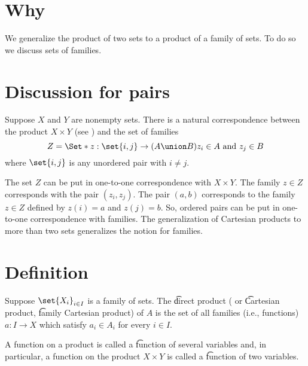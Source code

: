 
\section*{Why}

We generalize the product of two sets to a product of a family of sets.
To do so we discuss sets of families.

\section*{Discussion for pairs}

Suppose $X$ and $Y$ are nonempty sets.
There is a natural correspondence between the product $X \times Y$ (see ) and the set of families
\[
Z = \Set*{z: \set{i, j} \to (A \union B)}{z_i \in A \text{ and } z_j \in B}
\]
where $\set{i,j}$ is any unordered pair with $i \neq j$.

The set $Z$ can be put in one-to-one correspondence with $X \times  Y$.
The family $z \in Z$ corresponds with the pair $(z_i, z_j)$.
The pair $(a, b)$ corresponds to the family $z \in Z$ defined by $z(i) = a$ and $z(j) = b$.
So, ordered pairs can be put in one-to-one correspondence with families.
The generalization of Cartesian products to more than two sets generalizes the notion for families.

\section*{Definition}

Suppose $\set{X_i}_{i \in I}$ is a family of sets.
The \t{direct product} ( or \t{Cartesian product}, \t{family Cartesian product}) of $A$ is the set of all families (i.e., functions) $a: I \to X$ which satisfy $a_i \in A_i$ for every $i \in I$.

A function on a product is called a \t{function of several variables} and, in particular, a function on the product $X \times  Y$ is called a \t{function of two variables}.


